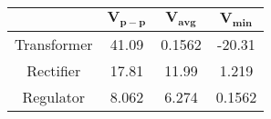 \small
\begin{tabular}{|c|c|c|c|}
	\hline
	\tbf{Output} &
		$\mathbf{V_{p-p}}$ \tbf{(\si{\volt})}&
			$\mathbf{V_{avg}}$ \tbf{(\si{\volt})}&
				$\mathbf{V_{min}}$ \tbf{(\si{\volt})} \\ \hline
	Transformer & 41.09 & 0.1562 & -20.31 \\ \hline
	Rectifier   & 17.81 & 11.99  &  1.219 \\ \hline
	Regulator   & 8.062 & 6.274  &  0.1562\\ \hline
\end{tabular}
